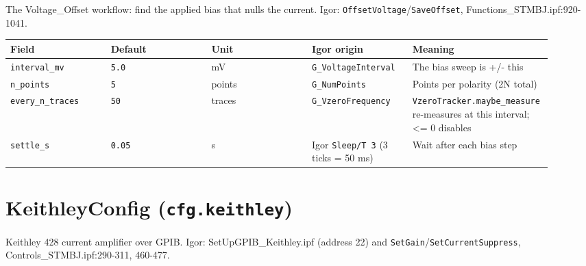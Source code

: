 The Voltage\_Offset workflow: find the applied bias that nulls the current. Igor: \texttt{Offset\discretionary{}{}{}Voltage}/\texttt{Save\discretionary{}{}{}Offset}, Functions\_STMBJ.ipf:920-1041.

\footnotesize\setlength{\LTleft}{0pt}\setlength{\LTright}{\fill}
\begin{longtable}{@{}>{\raggedright\arraybackslash}p{0.184\linewidth}>{\raggedright\arraybackslash}p{0.184\linewidth}>{\raggedright\arraybackslash}p{0.184\linewidth}>{\raggedright\arraybackslash}p{0.184\linewidth}>{\raggedright\arraybackslash}p{0.184\linewidth}@{}}
\toprule
\textbf{Field} & \textbf{Default} & \textbf{Unit} & \textbf{Igor origin} & \textbf{Meaning} \\
\midrule\endhead
\texttt{interval\_\discretionary{}{}{}mv} & \texttt{5.\discretionary{}{}{}0} & mV & \texttt{G\_\discretionary{}{}{}Voltage\discretionary{}{}{}Interval} & The bias sweep is +/- this \\
\texttt{n\_\discretionary{}{}{}points} & \texttt{5} & points & \texttt{G\_\discretionary{}{}{}Num\discretionary{}{}{}Points} & Points per polarity (2N total) \\
\texttt{every\_\discretionary{}{}{}n\_\discretionary{}{}{}traces} & \texttt{50} & traces & \texttt{G\_\discretionary{}{}{}Vzero\discretionary{}{}{}Frequency} & \texttt{Vzero\discretionary{}{}{}Tracker.\discretionary{}{}{}maybe\_\discretionary{}{}{}measure} re-measures at this interval; <= 0 disables \\
\texttt{settle\_\discretionary{}{}{}s} & \texttt{0.\discretionary{}{}{}05} & s & Igor \texttt{Sleep/\discretionary{}{}{}T 3} (3 ticks = 50 ms) & Wait after each bias step \\
\bottomrule
\end{longtable}
\normalsize

\section{KeithleyConfig (\texttt{cfg.\discretionary{}{}{}keithley})}

Keithley 428 current amplifier over GPIB. Igor: SetUpGPIB\_Keithley.ipf (address 22) and \texttt{Set\discretionary{}{}{}Gain}/\texttt{Set\discretionary{}{}{}Current\discretionary{}{}{}Suppress}, Controls\_STMBJ.ipf:290-311, 460-477.

